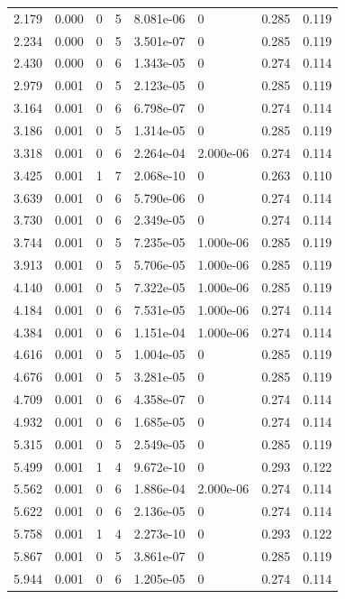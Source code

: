 \documentclass[preview]{standalone}
\begin{document}
{{\begin{tabular}{L{1.2cm}C{1.2cm} C{0.3cm}C{0.5cm} C{1.4cm}C{1.4cm} C{1.4cm}C{1.4cm}}
  2.179  &  0.000  & 0     &  5 &  8.081e-06  & 0  & 0.285 &  0.119   \\ 
  2.234  &  0.000  & 0     &  5 &  3.501e-07  & 0  & 0.285 &  0.119   \\ 
  2.430  &  0.000  & 0     &  6 &  1.343e-05  & 0  & 0.274 &  0.114   \\ 
  2.979  &  0.001  & 0     &  5 &  2.123e-05  & 0  & 0.285 &  0.119   \\ 
  3.164  &  0.001  & 0     &  6 &  6.798e-07  & 0  & 0.274 &  0.114   \\ 
  3.186  &  0.001  & 0     &  5 &  1.314e-05  & 0  & 0.285 &  0.119   \\ 
  3.318  &  0.001  & 0     &  6 &  2.264e-04  & 2.000e-06  & 0.274 &  0.114   \\ 
  3.425  &  0.001  & 1     &  7 &  2.068e-10  & 0  & 0.263 &  0.110   \\ 
  3.639  &  0.001  & 0     &  6 &  5.790e-06  & 0  & 0.274 &  0.114   \\ 
  3.730  &  0.001  & 0     &  6 &  2.349e-05  & 0  & 0.274 &  0.114   \\ 
  3.744  &  0.001  & 0     &  5 &  7.235e-05  & 1.000e-06  & 0.285 &  0.119   \\ 
  3.913  &  0.001  & 0     &  5 &  5.706e-05  & 1.000e-06  & 0.285 &  0.119   \\ 
  4.140  &  0.001  & 0     &  5 &  7.322e-05  & 1.000e-06  & 0.285 &  0.119   \\ 
  4.184  &  0.001  & 0     &  6 &  7.531e-05  & 1.000e-06  & 0.274 &  0.114   \\ 
  4.384  &  0.001  & 0     &  6 &  1.151e-04  & 1.000e-06  & 0.274 &  0.114   \\ 
  4.616  &  0.001  & 0     &  5 &  1.004e-05  & 0  & 0.285 &  0.119   \\ 
  4.676  &  0.001  & 0     &  5 &  3.281e-05  & 0  & 0.285 &  0.119   \\ 
  4.709  &  0.001  & 0     &  6 &  4.358e-07  & 0  & 0.274 &  0.114   \\ 
  4.932  &  0.001  & 0     &  6 &  1.685e-05  & 0  & 0.274 &  0.114   \\ 
  5.315  &  0.001  & 0     &  5 &  2.549e-05  & 0  & 0.285 &  0.119   \\ 
  5.499  &  0.001  & 1     &  4 &  9.672e-10  & 0  & 0.293 &  0.122   \\ 
  5.562  &  0.001  & 0     &  6 &  1.886e-04  & 2.000e-06  & 0.274 &  0.114   \\ 
  5.622  &  0.001  & 0     &  6 &  2.136e-05  & 0  & 0.274 &  0.114   \\ 
  5.758  &  0.001  & 1     &  4 &  2.273e-10  & 0  & 0.293 &  0.122   \\ 
  5.867  &  0.001  & 0     &  5 &  3.861e-07  & 0  & 0.285 &  0.119   \\ 
  5.944  &  0.001  & 0     &  6 &  1.205e-05  & 0  & 0.274 &  0.114   \\ 
\hline 
\end{tabular} 

}}
\end{document}
